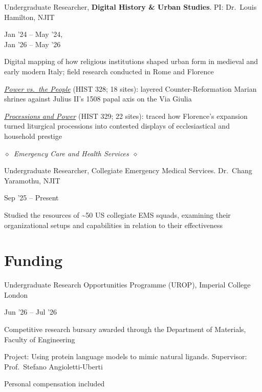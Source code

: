 \documentclass[10pt,a4paper]{article}
\newlength{\entrygap}\setlength{\entrygap}{5pt}
\newcommand{\entry}[2]{%
  \par\vspace{\entrygap}%
  \noindent
  \begin{minipage}[t]{0.795\textwidth}\raggedright #1\end{minipage}%
  \hfill
  \begin{minipage}[t]{0.19\textwidth}\raggedleft\small #2\end{minipage}%
  \par\penalty500
}
\newcommand{\subhead}[1]{%
  \par\vspace{10pt}\noindent$\diamond$\ {\fontsize{11}{13}\selectfont\itshape #1}\ $\diamond$\par\vspace{3pt}}
\begin{document}
\entry{Undergraduate Researcher, \textbf{Digital History \& Urban Studies}. PI: Dr.~Louis Hamilton, NJIT}{Jan '24 -- May '24,\\Jan '26 -- May '26}
\begin{cvitems}
  \item Digital mapping of how religious institutions shaped urban form in medieval and early modern Italy; field research conducted in Rome and Florence
  \item \href{https://uploads.knightlab.com/storymapjs/cbb86fd8d8b9cdc53b4e6e879d9db5f6/rome-2026/index.html}{\textit{Power vs.\ the People}} (HIST 328; 18 sites): layered Counter-Reformation Marian shrines against Julius II's 1508 papal axis on the Via Giulia
  \item \href{https://uploads.knightlab.com/storymapjs/cbb86fd8d8b9cdc53b4e6e879d9db5f6/final-essay-draft/index.html}{\textit{Processions and Power}} (HIST 329; 22 sites): traced how Florence's expansion turned liturgical processions into contested displays of ecclesiastical and household prestige
\end{cvitems}

\subhead{Emergency Care and Health Services}
\entry{Undergraduate Researcher, Collegiate Emergency Medical Services. Dr.~Chang Yaramothu, NJIT}{Sep '25 -- Present}
\begin{cvitems}
  \item Studied the resources of \textasciitilde{}50 US collegiate EMS squads, examining their organizational setups and capabilities in relation to their effectiveness
\end{cvitems}


\section{Funding}

\entry{Undergraduate Research Opportunities Programme (UROP), Imperial College London}{Jun '26 -- Jul '26}
\begin{cvitems}
  \item Competitive research bursary awarded through the Department of Materials, Faculty of Engineering
  \item Project: Using protein language models to mimic natural ligands. Supervisor: Prof.~Stefano Angioletti-Uberti
  \item Personal compensation included
\end{cvitems}
\end{document}

